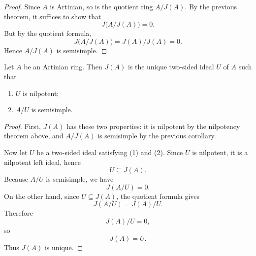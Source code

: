 \begin{proof}
    Since $A$ is Artinian, so is the quotient ring $A/J(A)$. By the previous theorem, it suffices to
    show that
    \[
        J\bigl(A/J(A)\bigr)=0.
    \]
    But by the quotient formula,
    \[
        J\bigl(A/J(A)\bigr)=J(A)/J(A)=0.
    \]
    Hence $A/J(A)$ is semisimple.
\end{proof}

\begin{corollary}
    Let $A$ be an Artinian ring. Then $J(A)$ is the unique two-sided ideal $U$ of $A$ such that
    \begin{enumerate}
        \item $U$ is nilpotent;
        \item $A/U$ is semisimple.
    \end{enumerate}
\end{corollary}

\begin{proof}
    First, $J(A)$ has these two properties: it is nilpotent by the nilpotency theorem above, and
    $A/J(A)$ is semisimple by the previous corollary.

    Now let $U$ be a two-sided ideal satisfying \textup{(1)} and \textup{(2)}.
    Since $U$ is nilpotent, it is a nilpotent left ideal, hence
    \[
        U\subseteq J(A).
    \]
    Because $A/U$ is semisimple, we have
    \[
        J(A/U)=0.
    \]
    On the other hand, since $U\subseteq J(A)$, the quotient formula gives
    \[
        J(A/U)=J(A)/U.
    \]
    Therefore
    \[
        J(A)/U=0,
    \]
    so
    \[
        J(A)=U.
    \]
    Thus $J(A)$ is unique.
\end{proof}

